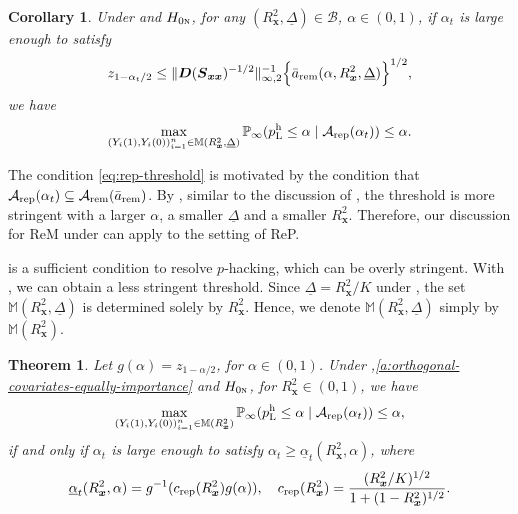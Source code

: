 \documentclass[12pt]{article}
\newtheorem{theorem}{Theorem}
\newtheorem{corollary}{Corollary}
\newcommand{\Prob}{\mathbb{P}}
\newcommand{\ma}{\mathcal{A}}
\newcommand{\rem}{\textnormal{rem}}
\newcommand{\rep}{\textnormal{rep}}
\newcommand{\bs}{\boldsymbol}
\newcommand{\hpL}{p_\textnormal{L}^{\textnormal{h}}}
\begin{document}
\begin{corollary}
\label{cor:bound-of-rep-derived-by-direct-inequality}
 Under  and $H_{0\textsc{n}}$, for any $(R^2_{\bs{x}},\underline{\Delta})\in \mathcal{B}$, $\alpha \in (0,1)$, if $\alpha_t$ is large enough to satisfy
\begin{align}
\label{eq:rep-threshold}
    z_{1-\alpha_t/2} \leq  \lVert\bs{D}(\bs{S}_{\bs{x}\bs{x}})^{-1/2}\lVert^{-1}_{\infty,2} \Big\{\bar{a}_{\rem}(\alpha,R^2_{\bs{x}}, \underline{\Delta})\Big\}^{1/2},
\end{align}
we have
\begin{align*}    \max_{(Y_i(1),Y_i(0))_{i=1}^n\in\mathbb{M}(R^2_{\bs{x}}, \underline{\Delta})} \Prob_{\infty}(\hpL \leq \alpha  \mid \ma_{\rep}(\alpha_t))\leq \alpha.
    \end{align*}
\end{corollary}

The condition \eqref{eq:rep-threshold} is motivated by the condition that $\ma_{\rep}(\alpha_t)\subseteq \ma_{\rem}(\bar{a}_{\rem})$.
  By , similar to the discussion of , the threshold is more stringent with a larger $\alpha$, a smaller $\underline{\Delta}$ and a smaller $R^2_{\bs{x}}$. Therefore, our discussion for ReM under  can apply to the setting of ReP. 

 is a sufficient condition to resolve $p$-hacking, which can be overly stringent. With , we can obtain a less stringent threshold. Since $\underline{\Delta} = R^2_{\bs{x}}/K$ under , the set $\mathbb{M}(R^2_{\bs{x}},\underline{\Delta})$ is determined solely by $R^2_{\bs{x}}$. Hence, we denote $\mathbb{M}(R^2_{\bs{x}},\underline{\Delta})$ simply by $\mathbb{M}(R^2_{\bs{x}})$.

\begin{theorem}
\label{thm:rep-orthogonal-covariates-equally-importance}
  Let $g(\alpha) = z_{1-\alpha/2}$, for $\alpha \in (0,1)$. Under ,\ref{a:orthogonal-covariates-equally-importance} and $H_{0\textsc{n}}$, for $R^2_{\bs{x}} \in (0,1)$, we have
    \begin{align*}
 \max_{(Y_i(1),Y_i(0))_{i=1}^n\in\mathbb{M}(R^2_{\bs{x}})}\Prob_{\infty}( \hpL \leq \alpha\mid \ma_{\rep}(\alpha_t)) \leq \alpha,
\end{align*}
if and only if $\alpha_t$ is large enough to satisfy $\alpha_t \geq \underline{\alpha}_{t}(R^2_{\bs{x}},\alpha)$, where
    \begin{align*}
        \underline{\alpha}_{t}(R^2_{\bs{x}},\alpha)= g^{-1}(c_{\rep}(R^2_{\bs{x}})g(\alpha)),\quad c_{\rep}(R^2_{\bs{x}}) = \frac{(R^2_{\bs{x}}/K)^{1/2}}{1+(1-R^2_{\bs{x}})^{1/2}}.
    \end{align*}
\end{theorem}
\end{document}
